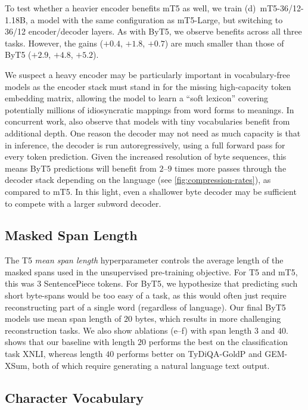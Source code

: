 \documentclass[11pt,a4paper]{article}
\begin{document}
To test whether a heavier encoder benefits mT5 as well, we train (d)~mT5-36/12-1.18B, a model with the same configuration as mT5-Large, but switching to 36/12 encoder/decoder layers. As with ByT5, we observe benefits across all three tasks. However, the gains ($+0.4$, $+1.8$, $+0.7$) are much smaller than those of ByT5 ($+2.9$, $+4.8$, $+5.2$).

We suspect a heavy encoder may be particularly important in vocabulary-free models as the encoder stack must stand in for the missing high-capacity token embedding matrix, allowing the model to learn a ``soft lexicon'' covering potentially millions of idiosyncratic mappings from word forms to meanings.
In concurrent work, \citet{wies-2021-transformer} also observe that models with tiny vocabularies benefit from additional depth. One reason the decoder may not need as much capacity is that in inference, the decoder is run autoregressively, using a full forward pass for every token prediction. Given the increased resolution of byte sequences, this means ByT5 predictions will benefit from $2$--$9$ times more passes through the decoder stack depending on the language (see \cref{fig:compression-rates}), as compared to mT5. In this light, even a shallower byte decoder may be sufficient to compete with a larger subword decoder.

\subsection{Masked Span Length}

The T5 \textit{mean span length} hyperparameter controls the average length of the masked spans used in the unsupervised pre-training objective. For T5 and mT5, this was $3$ SentencePiece tokens. For ByT5, we hypothesize that predicting such short byte-spans would be too easy of a task, as this would often just require reconstructing part of a single word (regardless of language). Our final ByT5 models use mean span length of $20$ bytes, which results in more challenging reconstruction tasks. We also show ablations (e--f) with span length $3$ and $40$.  shows that our baseline with length $20$ performs the best on the classification task XNLI, whereas length $40$ performs better on TyDiQA-GoldP and \mbox{GEM-XSum}, both of which require generating a natural language text output.

\subsection{Character Vocabulary}
\end{document}

